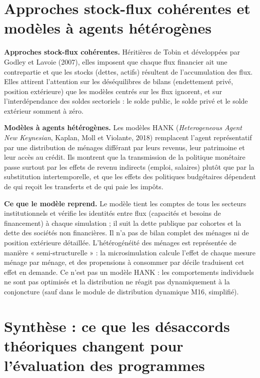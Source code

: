 \documentclass[
  11pt,
  11pt,
  a4paper,
  openany]{book}
\begin{document}
\hypertarget{sec:heterogenes}{%
\section{Approches stock-flux cohérentes et modèles à agents
hétérogènes}\label{sec:heterogenes}}

\textbf{Approches stock-flux cohérentes.} Héritières de Tobin et
développées par Godley et Lavoie (2007), elles imposent que chaque flux
financier ait une contrepartie et que les stocks (dettes, actifs)
résultent de l'accumulation des flux. Elles attirent l'attention sur les
déséquilibres de bilans (endettement privé, position extérieure) que les
modèles centrés sur les flux ignorent, et sur l'interdépendance des
soldes sectoriels : le solde public, le solde privé et le solde
extérieur somment à zéro.

\textbf{Modèles à agents hétérogènes.} Les modèles HANK
(\emph{Heterogeneous Agent New Keynesian}, Kaplan, Moll et Violante,
2018) remplacent l'agent représentatif par une distribution de ménages
différant par leurs revenus, leur patrimoine et leur accès au crédit.
Ils montrent que la transmission de la politique monétaire passe surtout
par les effets de revenu indirects (emploi, salaires) plutôt que par la
substitution intertemporelle, et que les effets des politiques
budgétaires dépendent de qui reçoit les transferts et de qui paie les
impôts.

\textbf{Ce que le modèle reprend.} Le modèle tient les comptes de tous
les secteurs institutionnels et vérifie les identités entre flux
(capacités et besoins de financement) à chaque simulation ; il suit la
dette publique par cohortes et la dette des sociétés non financières. Il
n'a pas de bilan complet des ménages ni de position extérieure
détaillée. L'hétérogénéité des ménages est représentée de manière «
semi-structurelle » : la microsimulation calcule l'effet de chaque
mesure ménage par ménage, et des propensions à consommer par décile
traduisent cet effet en demande. Ce n'est pas un modèle HANK : les
comportements individuels ne sont pas optimisés et la distribution ne
réagit pas dynamiquement à la conjoncture (sauf dans le module de
distribution dynamique M16, simplifié).

\hypertarget{sec:synthese-theorie}{%
\section{Synthèse : ce que les désaccords théoriques changent pour
l'évaluation des programmes}\label{sec:synthese-theorie}}
\end{document}
